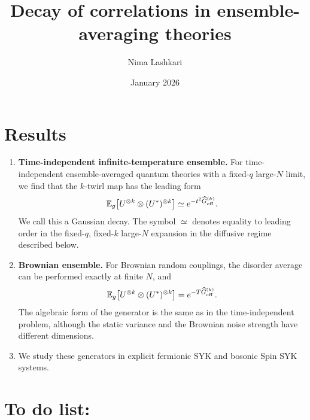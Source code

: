 \documentclass{article}
\title{Decay of correlations in ensemble-averaging theories}
\author{Nima Lashkari}
\date{January 2026}
\theoremstyle{definition}
\begin{document}
    \maketitle
    \tableofcontents

    \section*{Results}

\begin{enumerate}
\item \textbf{Time-independent infinite-temperature ensemble.}
For time-independent ensemble-averaged quantum theories with a fixed-$q$
large-$N$ limit, we find that the $k$-twirl map has the leading form
\begin{equation}
    \mathbb E_g\!\left[U^{\otimes k}\otimes(U^*)^{\otimes k}\right]
    \simeq e^{-t^2\widehat G_{\rm eff}^{(k)}}.
\end{equation}
We call this a Gaussian decay.  The symbol $\simeq$ denotes equality to
leading order in the fixed-$q$, fixed-$k$ large-$N$ expansion in the
diffusive regime described below.

\item \textbf{Brownian ensemble.}
For Brownian random couplings, the disorder average can be performed exactly
at finite $N$, and
\begin{equation}
    \mathbb E_g\!\left[U^{\otimes k}\otimes(U^*)^{\otimes k}\right]
    =e^{-T\widehat G_{\rm eff}^{(k)}}.
\end{equation}
The algebraic form of the generator is the same as in the time-independent
problem, although the static variance and the Brownian noise strength have
different dimensions.

\item We study these generators in explicit fermionic SYK and bosonic Spin
SYK systems.
\end{enumerate}


\section*{To do list:}
\end{document}
